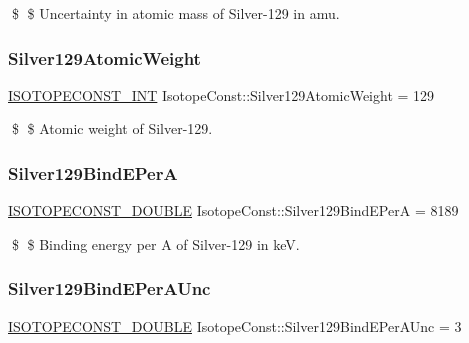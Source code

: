 \$ \$ Uncertainty in atomic mass of Silver-\/129 in amu. \mbox{\label{group___isotope_const-_silver-_ag129_gae89307afec21a048161e699e1275ce15}} 
\subsubsection{\texorpdfstring{Silver129\+Atomic\+Weight}{Silver129AtomicWeight}}
{\footnotesize\ttfamily \mbox{\hyperlink{group___isotope_const-_macros_ga5f18360b3e99483a35c32d789e62621c}{I\+S\+O\+T\+O\+P\+E\+C\+O\+N\+S\+T\+\_\+\+I\+NT}} Isotope\+Const\+::\+Silver129\+Atomic\+Weight = 129}

\$ \$ Atomic weight of Silver-\/129. \mbox{\label{group___isotope_const-_silver-_ag129_gacff859a6f527d7e5150909c1d48c2904}} 
\subsubsection{\texorpdfstring{Silver129\+Bind\+E\+PerA}{Silver129BindEPerA}}
{\footnotesize\ttfamily \mbox{\hyperlink{group___isotope_const-_macros_ga8f45a7272ce02c0b4c65c44636ed719a}{I\+S\+O\+T\+O\+P\+E\+C\+O\+N\+S\+T\+\_\+\+D\+O\+U\+B\+LE}} Isotope\+Const\+::\+Silver129\+Bind\+E\+PerA = 8189}

\$ \$ Binding energy per A of Silver-\/129 in keV. \mbox{\label{group___isotope_const-_silver-_ag129_ga8079391999c1c52e39b3d13c6df20b10}} 
\subsubsection{\texorpdfstring{Silver129\+Bind\+E\+Per\+A\+Unc}{Silver129BindEPerAUnc}}
{\footnotesize\ttfamily \mbox{\hyperlink{group___isotope_const-_macros_ga8f45a7272ce02c0b4c65c44636ed719a}{I\+S\+O\+T\+O\+P\+E\+C\+O\+N\+S\+T\+\_\+\+D\+O\+U\+B\+LE}} Isotope\+Const\+::\+Silver129\+Bind\+E\+Per\+A\+Unc = 3}

